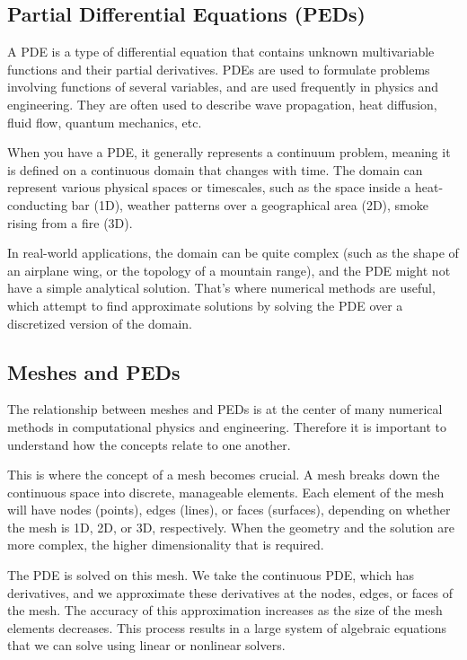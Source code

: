 \documentclass[12pt, a4paper]{scrartcl}
\begin{document}
\subsection{Partial Differential Equations (PEDs)}

A PDE is a type of differential equation that 
contains unknown multivariable functions and their partial derivatives. PDEs are used to 
formulate problems involving functions of several variables, and are used frequently in physics 
and engineering. They are often used to describe wave propagation, heat diffusion, fluid flow, quantum mechanics, etc.

When you have a PDE, it generally represents a continuum problem, meaning it is defined 
on a continuous domain that changes with time. The domain can represent various physical spaces or timescales, 
such as the space inside a heat-conducting bar (1D), weather patterns over a geographical 
area (2D), smoke rising from a fire (3D).

In real-world applications, the domain can be quite complex (such as the shape of an 
airplane wing, or the topology of a mountain range), and the PDE might not have a simple 
analytical solution. That's where numerical methods are useful, which attempt to find 
approximate solutions by solving the PDE over a discretized version of the domain.

\subsection{Meshes and PEDs}

The relationship between meshes and PEDs is at the center of many numerical methods 
in computational physics and engineering. Therefore it is important to understand how 
the concepts relate to one another.

This is where the concept of a mesh becomes crucial. A mesh breaks down the continuous space into discrete, manageable elements. 
Each element of the mesh will have nodes (points), edges (lines), or faces (surfaces), 
depending on whether the mesh is 1D, 2D, or 3D, respectively. When the geometry
and the solution are more complex, the higher dimensionality that is required.

The PDE is solved on this mesh. We take the continuous 
PDE, which has derivatives, and we approximate these derivatives at the nodes, edges, or 
faces of the mesh. The accuracy of this approximation increases as the size of the mesh 
elements decreases. This process results in a large system of algebraic equations that we 
can solve using linear or nonlinear solvers.
\end{document}
